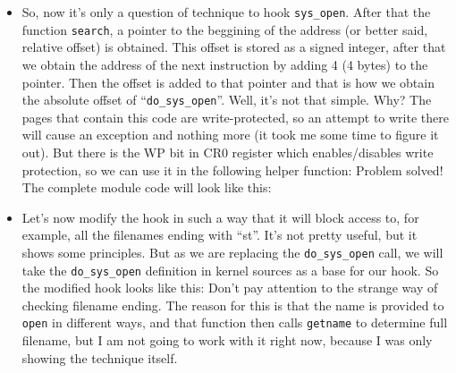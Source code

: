 \documentclass[12pt]{article}
\begin{document}
\begin{itemize}
  \item So, now it's only a question of technique to hook
    \verb!sys_open!. After that the function \verb!search!, a pointer to the
    beggining of the address (or better said, relative offset) is
    obtained. This offset is stored as a signed integer, after that we obtain
    the address of the next instruction by adding 4 (4 bytes) to the
    pointer. Then the offset is added to that pointer and that is how we
    obtain the absolute offset of ``\verb!do_sys_open!''. Well, it's not that
    simple. Why? The pages that contain this code are write-protected, so an
    attempt to write there will cause an exception and nothing more (it took
    me some time to figure it out). But there is the WP bit in CR0 register
    which enables/disables write protection, so we can use it in the following
    helper function:
    Problem solved! The complete module code will look like this:
    

  \item Let's now modify the hook in such a way that it will block
    access to, for example, all the filenames ending with ``st''. It's
    not pretty useful, but it shows some principles. But as we are
    replacing the \verb!do_sys_open! call, we will take the
    \verb!do_sys_open! definition in kernel sources as a base for our
    hook. So the modified hook looks like
    this: Don't pay attention to the
    strange way of checking filename ending. The reason for this is
    that the name is provided to \verb!open! in different ways, and
    that function then calls \verb!getname! to determine full
    filename, but I am not going to work with it right now, because I
    was only showing the technique itself.
  \end{itemize}
\end{document}

